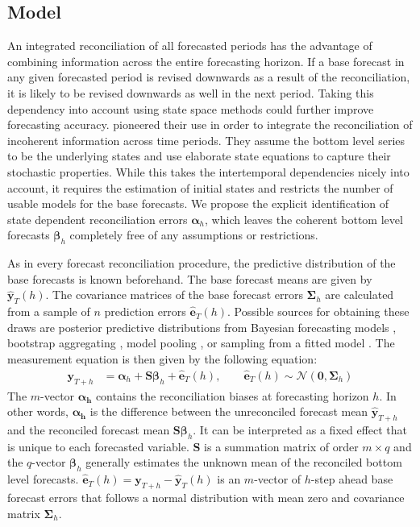 \documentclass[a4paper,fleqn,11pt]{article}
\begin{document}
\subsection{Model}
An integrated reconciliation of all forecasted periods has the advantage of combining information across the entire forecasting horizon. If a base forecast in any given forecasted period is revised downwards as a result of the reconciliation, it is likely to be revised downwards as well in the next period. Taking this dependency into account using state space methods could further improve forecasting accuracy. \cite{Pennings2017} pioneered their use in order to integrate the reconciliation of incoherent information across time periods. They assume the bottom level series to be the underlying states and use elaborate state equations to capture their stochastic properties. While this takes the intertemporal dependencies nicely into account, it requires the estimation of initial states and restricts the number of usable models for the base forecasts. We propose the explicit identification of state dependent reconciliation errors $\boldsymbol{\alpha}_h$, which leaves the coherent bottom level forecasts $\boldsymbol{\beta}_h$ completely free of any assumptions or restrictions.

As in every forecast reconciliation procedure, the predictive distribution of the base forecasts is known beforehand. The base forecast means are given by $\mathbf{\hat{y}}_{T}(h)$. The covariance matrices of the base forecast errors $\boldsymbol{\Sigma}_h$ are calculated from a sample of $n$ prediction errors $\mathbf{\hat{e}}_{T}(h)$. Possible sources for obtaining these draws are posterior predictive distributions from Bayesian forecasting models \citep{Cesur2016}, bootstrap aggregating \citep{Bergmeir2016}, model pooling \citep{Timmermann2006}, or sampling from a fitted model \citep{Hyndman2018}. The measurement equation is then given by the following equation:
\begin{align}
\label{eq:main}
\textbf{y}_{T+h} & = \boldsymbol{\alpha}_h + \textbf{S} \boldsymbol{\beta}_h + \mathbf{\hat{e}}_{T}(h), \qquad \mathbf{\hat{e}}_{T}(h) \sim \mathcal{N}(\textbf{0}, \boldsymbol{\Sigma}_h)
\end{align}
The $m$-vector $\boldsymbol{\alpha_h}$ contains the reconciliation biases at forecasting horizon $h$. In other words, $\boldsymbol{\alpha_h}$ is the difference between the unreconciled forecast mean $\mathbf{\hat{y}}_{T+h}$ and the reconciled forecast mean $\textbf{S} \boldsymbol{\beta}_h$. It can be interpreted as a fixed effect that is unique to each forecasted variable. $\textbf{S}$ is a summation matrix of order $m \times q$ and the $q$-vector $\boldsymbol{\beta}_h$ generally estimates the unknown mean of the reconciled bottom level forecasts.  $\mathbf{\hat{e}}_{T}(h) = \textbf{y}_{T+h} - \mathbf{\hat{y}}_{T}(h)$ is an $m$-vector of $h$-step ahead base forecast errors that follows a normal distribution with mean zero and covariance matrix $\boldsymbol{\Sigma}_h$.
\end{document}
